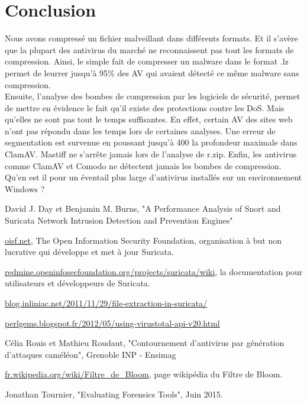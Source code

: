 \documentclass{svjour3}
\begin{document}
\section{Conclusion}
\label{2.3conclusion}
Nous avons compressé un fichier malveillant dans différents formats. Et il s’avère que la plupart des antivirus du marché ne reconnaissent pas tout les formats de compression. Ainsi, le simple fait de compresser un malware dans le format .lz permet de leurrer jusqu’à 95\% des AV qui avaient détecté ce même malware sans compression.\\
Ensuite, l'analyse des bombes de compression par les logiciels de sécurité, permet de mettre en évidence le fait qu'il existe des protections contre les DoS. Mais qu'elles ne sont pas tout le temps suffisantes. En effet, certain AV des sites web n'ont pas répondu dans les temps lors de certaines analyses. Une erreur de segmentation est survenue en poussant jusqu'à 400 la profondeur maximale dans ClamAV. Mastiff ne s’arrête jamais lors de l'analyse de r.zip. Enfin, les antivirus comme ClamAV et Comodo ne détectent jamais les bombes de compression.\\
Qu'en est il pour un éventail plus large d'antivirus installés sur un environnement Windows ?


\begin{thebibliography}{}
%

David J. Day et Benjamin M. Burns, "A Performance Analysis of Snort and Suricata Network Intrusion Detection and Prevention Engines"

\url{oisf.net}, The Open Information Security Foundation, organisation à but non lucrative qui développe et met à jour Suricata.

\url{redmine.openinfosecfoundation.org/projects/suricata/wiki}, la documentation pour utilisateurs et développeurs de Suricata.

\url{blog.inliniac.net/2011/11/29/file-extraction-in-suricata/}

\url{perlgems.blogspot.fr/2012/05/using-virustotal-api-v20.html}

Célia Rouis et Mathieu Roudaut, "Contournement d'antivirus par génération d'attaques caméléon", Grenoble INP - Ensimag

\url{fr.wikipedia.org/wiki/Filtre_de_Bloom}, page wikipédia du Filtre de Bloom.

Jonathan Tournier, "Evaluating Forensics Tools", Juin 2015.


\end{thebibliography}
\end{document}
